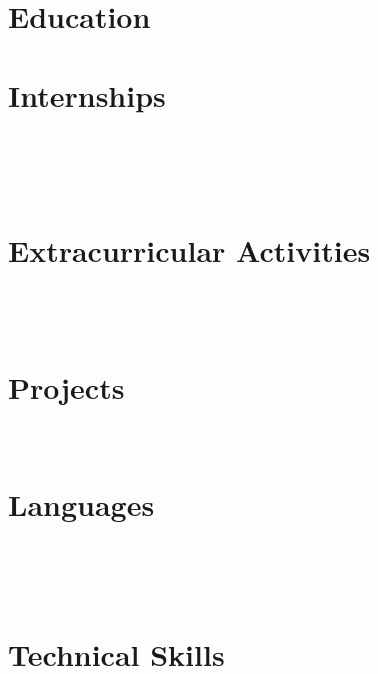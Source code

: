 \documentclass{cv}
\begin{document}
	
	
	\section{Education}
		
	\section{Internships}
		\\
		\\
		\\
		
	\section{Extracurricular Activities}
		\smallskip\\
		\smallskip\\
		
	\section{Projects}
		\\
		
	\section{Languages}
	\begin{minipage}{0.5\linewidth}
		\\
		
	\end{minipage}%
	\begin{minipage}{0.5\linewidth}
		\\
		
	\end{minipage}
	\section{Technical Skills}
		\\
		\\
		\\
		\\
		\\
		
\end{document}
